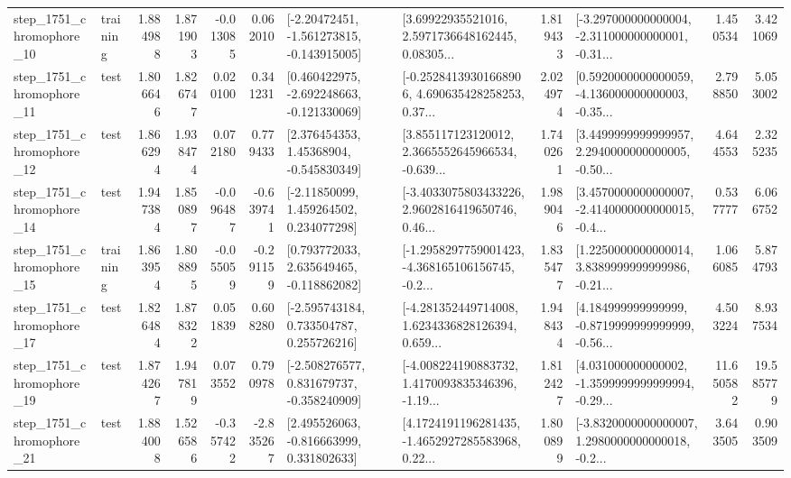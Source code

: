 \begin{tabular}{llrrrrllrlrr}
 step\_1751\_chromophore\_10 &  training &      1.884988 &    1.871903 &     -0.013085 &  0.062010 &   [-2.20472451, -1.561273815, -0.143915005] &  [3.69922935521016, 2.5971736648162445, 0.08305... &       1.819433 &  [-3.297000000000004, -2.311000000000001, -0.31... &            1.450534 &          3.421069 \\
 step\_1751\_chromophore\_11 &      test &      1.806646 &    1.826747 &      0.020100 &  0.341231 &   [0.460422975, -2.692248663, -0.121330069] &  [-0.25284139301668906, 4.690635428258253, 0.37... &       2.024974 &  [0.5920000000000059, -4.136000000000003, -0.35... &            2.798850 &          5.053002 \\
 step\_1751\_chromophore\_12 &      test &      1.866294 &    1.938474 &      0.072180 &  0.779433 &     [2.376454353, 1.45368904, -0.545830349] &  [3.855117123120012, 2.3665552645966534, -0.639... &       1.740261 &  [3.4499999999999957, 2.2940000000000005, -0.50... &            4.644553 &          2.325235 \\
 step\_1751\_chromophore\_14 &      test &      1.947384 &    1.850897 &     -0.096487 & -0.639741 &     [-2.11850099, 1.459264502, 0.234077298] &  [-3.4033075803433226, 2.9602816419650746, 0.46... &       1.989046 &  [3.4570000000000007, -2.4140000000000015, -0.4... &            0.537777 &          6.066752 \\
 step\_1751\_chromophore\_15 &  training &      1.863954 &    1.808895 &     -0.055059 & -0.291159 &    [0.793772033, 2.635649465, -0.118862082] &  [-1.2958297759001423, -4.368165106156745, -0.2... &       1.835477 &  [1.2250000000000014, 3.8389999999999986, -0.21... &            1.066085 &          5.874793 \\
 step\_1751\_chromophore\_17 &      test &      1.826484 &    1.878322 &      0.051839 &  0.608280 &    [-2.595743184, 0.733504787, 0.255726216] &  [-4.281352449714008, 1.6234336828126394, 0.659... &       1.948434 &  [4.184999999999999, -0.8719999999999999, -0.56... &            4.503224 &          8.937534 \\
 step\_1751\_chromophore\_19 &      test &      1.874267 &    1.947819 &      0.073552 &  0.790978 &   [-2.508276577, 0.831679737, -0.358240909] &  [-4.008224190883732, 1.4170093835346396, -1.19... &       1.812427 &  [4.031000000000002, -1.3599999999999994, -0.29... &           11.650582 &         19.585779 \\
 step\_1751\_chromophore\_21 &      test &      1.884008 &    1.526586 &     -0.357422 & -2.835267 &    [2.495526063, -0.816663999, 0.331802633] &  [4.1724191196281435, -1.4652927285583968, 0.22... &       1.800899 &  [-3.8320000000000007, 1.2980000000000018, -0.2... &            3.643505 &          0.903509 \\

\end{tabular}
